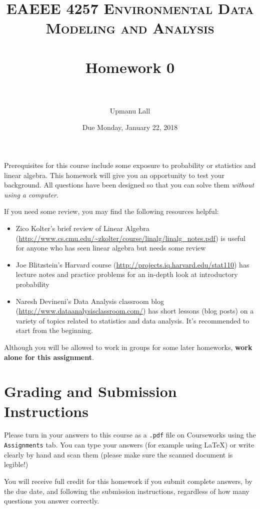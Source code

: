 \documentclass[paper=letter, fontsize=11pt]{scrartcl}
\title{
\normalfont \normalsize
\textsc{EAEEE 4257 Environmental Data Modeling and Analysis} \\ [25pt] %
\horrule{0.5pt} \\[0.4cm] %
\huge Homework 0 \\ %
\horrule{2pt} \\[0.5cm] %
}
\author{Upmanu Lall} %
\date{\normalsize Due Monday, January 22, 2018} %
\numberwithin{equation}{section}
\numberwithin{figure}{section}
\numberwithin{table}{section}
\begin{document}
\maketitle %


Prerequisites for this course include some exposure to probability or statistics and linear algebra.
This homework will give you an opportunity to test your background.
All questions have been designed so that you can solve them \emph{without using a computer}.

If you need some review, you may find the following resources helpful:
\begin{itemize}
  \item Zico Kolter's brief review of Linear Algebra (\url{http://www.cs.cmu.edu/~zkolter/course/linalg/linalg_notes.pdf}) is useful for anyone who has seen linear algebra but needs some review
  \item Joe Blitzstein's Harvard course (\url{http://projects.iq.harvard.edu/stat110}) has lecture notes and practice problems for an in-depth look at introductory probability
  \item Naresh Devineni's Data Analysis classroom blog (\url{http://www.dataanalysisclassroom.com/}) has short lessons (blog posts) on a variety of topics related to statistics and data analysis. It's recommended to start from the beginning.
\end{itemize}

Although you will be allowed to work in groups for some later homeworks, \textbf{work alone for this assignment}.

\section*{Grading and Submission Instructions}

Please turn in your answers to this course as a \texttt{.pdf} file on Courseworks using the \texttt{Assignments} tab.
You can type your answers (for example using \LaTeX) or write clearly by hand and scan them (please make sure the scanned document is legible!)

You will receive full credit for this homework if you submit complete answers, by the due date, and following the submission instructions, regardless of how many questions you answer correctly.
\end{document}
